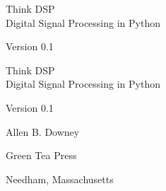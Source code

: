\documentclass[12pt]{book}
\newcommand{\theversion}{0.1}
\begin{document}
\begin{latexonly}

\renewcommand{\blankpage}{\thispagestyle{empty} \quad \newpage}


\thispagestyle{empty}

\begin{flushright}
\vspace*{2.0in}

\begin{spacing}{3}
{\huge Think DSP}\\
{\Large Digital Signal Processing in Python}
\end{spacing}

\vspace{0.25in}

Version \theversion

\vfill

\end{flushright}


\blankpage
\blankpage

\pagebreak
\thispagestyle{empty}

\begin{flushright}
\vspace*{2.0in}

\begin{spacing}{3}
{\huge Think DSP}\\
{\Large Digital Signal Processing in Python}
\end{spacing}

\vspace{0.25in}

Version \theversion

\vspace{1in}


{\Large
Allen B. Downey\\
}


\vspace{0.5in}

{\Large Green Tea Press}

{\small Needham, Massachusetts}

\vfill

\end{flushright}


\pagebreak
\thispagestyle{empty}


\end{latexonly}
\end{document}
